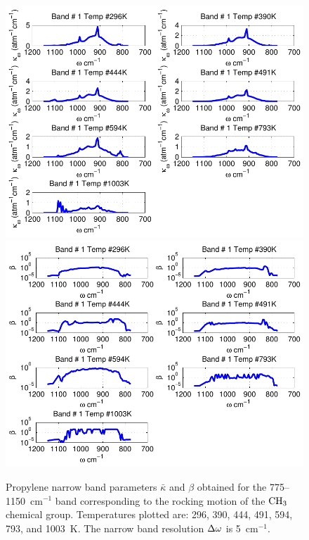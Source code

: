 \begin{figure}[p]
\begin{center}
\includegraphics[width=5.0in]{Figures/Propylene_Kappa_Band1_MALKMUS.pdf}
\includegraphics[width=5.0in]{Figures/Propylene_Beta_Band1_MALKMUS.pdf}
\end{center}
\caption{Propylene narrow band parameters $\bar{\kappa}$ and $\beta$ obtained for the 775--1150~cm$^{-1}$ band corresponding to the rocking motion of the $\rm CH_3$ chemical group. Temperatures plotted are: 296, 390, 444, 491, 594, 793, and 1003~K. The narrow band resolution $\Delta \omega$ is 5~cm$^{-1}$.\label{fig:propylene_kappa_beta1}}
\end{figure}

